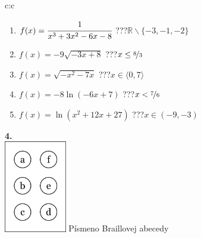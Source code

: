 \documentclass[10pt]{report}
\begin{document}
\begin{tabular}{c:c}
\begin{minipage}[c][99mm][t]{0.49\linewidth}
\begin{center}
\begin{minipage}{0.77\linewidth}
\begin{center}
\begin{varwidth}{\textwidth}
\begin{enumerate}
\item $f(x)=\cfrac{1}{x^3+3x^2-6x-8}$\quad \dotfill\; ???\;\dotfill \quad $\mathbb{R}\smallsetminus\{-3,-1,-2\}$
\item $f(x)=-9\sqrt{-3x+8}$\quad \dotfill\; ???\;\dotfill \quad $x\leq\nicefrac{8}{3}$
\item $f(x)=\sqrt{-x^2-7x}$\quad \dotfill\; ???\;\dotfill \quad $x\in\langle0 , 7\rangle$
\item $f(x)=-8\ln{(-6x+7)}$\quad \dotfill\; ???\;\dotfill \quad $x<\nicefrac{7}{6}$
\item $f(x)=\ln{(x^2+12x+27)}$\quad \dotfill\; ???\;\dotfill \quad $x\in(-9 , -3)$
\end{enumerate}
\end{varwidth}
\end{center}
\end{minipage}
\begin{minipage}{0.20\linewidth}
\begin{center}
{\Huge\bfseries 4.} \\[2mm]
\includegraphics[height=40mm]{../images/braille.png}
{\small Písmeno Braillovej abecedy}
\end{center}
\end{minipage}
\end{center}
\end{minipage}
%
\end{tabular}
\newpage
\end{document}
